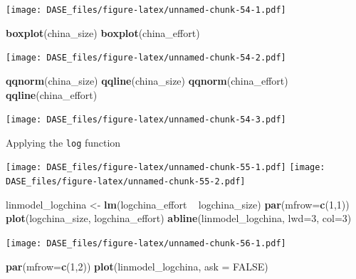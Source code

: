 \documentclass[]{book}
\newenvironment{Shaded}{\begin{snugshade}}{\end{snugshade}}
\newcommand{\KeywordTok}[1]{\textcolor[rgb]{0.13,0.29,0.53}{\textbf{{#1}}}}
\newcommand{\DataTypeTok}[1]{\textcolor[rgb]{0.13,0.29,0.53}{{#1}}}
\newcommand{\DecValTok}[1]{\textcolor[rgb]{0.00,0.00,0.81}{{#1}}}
\newcommand{\StringTok}[1]{\textcolor[rgb]{0.31,0.60,0.02}{{#1}}}
\newcommand{\OtherTok}[1]{\textcolor[rgb]{0.56,0.35,0.01}{{#1}}}
\newcommand{\NormalTok}[1]{{#1}}
\begin{document}
\texttt{[image: DASE\_files/figure-latex/unnamed-chunk-54-1.pdf]}

\begin{Shaded}
\begin{Highlighting}[]
\KeywordTok{boxplot}\NormalTok{(china_size)}
\KeywordTok{boxplot}\NormalTok{(china_effort)}
\end{Highlighting}
\end{Shaded}

\texttt{[image: DASE\_files/figure-latex/unnamed-chunk-54-2.pdf]}

\begin{Shaded}
\begin{Highlighting}[]
\KeywordTok{qqnorm}\NormalTok{(china_size)}
\KeywordTok{qqline}\NormalTok{(china_size)}
\KeywordTok{qqnorm}\NormalTok{(china_effort)}
\KeywordTok{qqline}\NormalTok{(china_effort)}
\end{Highlighting}
\end{Shaded}

\texttt{[image: DASE\_files/figure-latex/unnamed-chunk-54-3.pdf]}

Applying the \texttt{log} function

\texttt{[image: DASE\_files/figure-latex/unnamed-chunk-55-1.pdf]}
\texttt{[image: DASE\_files/figure-latex/unnamed-chunk-55-2.pdf]}

\begin{Shaded}
\begin{Highlighting}[]
\NormalTok{linmodel_logchina <-}\StringTok{ }\KeywordTok{lm}\NormalTok{(logchina_effort ~}\StringTok{ }\NormalTok{logchina_size)}
\KeywordTok{par}\NormalTok{(}\DataTypeTok{mfrow=}\KeywordTok{c}\NormalTok{(}\DecValTok{1}\NormalTok{,}\DecValTok{1}\NormalTok{))}
\KeywordTok{plot}\NormalTok{(logchina_size, logchina_effort)}
\KeywordTok{abline}\NormalTok{(linmodel_logchina, }\DataTypeTok{lwd=}\DecValTok{3}\NormalTok{, }\DataTypeTok{col=}\DecValTok{3}\NormalTok{)}
\end{Highlighting}
\end{Shaded}

\texttt{[image: DASE\_files/figure-latex/unnamed-chunk-56-1.pdf]}

\begin{Shaded}
\begin{Highlighting}[]
\KeywordTok{par}\NormalTok{(}\DataTypeTok{mfrow=}\KeywordTok{c}\NormalTok{(}\DecValTok{1}\NormalTok{,}\DecValTok{2}\NormalTok{))}
\KeywordTok{plot}\NormalTok{(linmodel_logchina, }\DataTypeTok{ask =} \OtherTok{FALSE}\NormalTok{)}
\end{Highlighting}
\end{Shaded}
\end{document}
